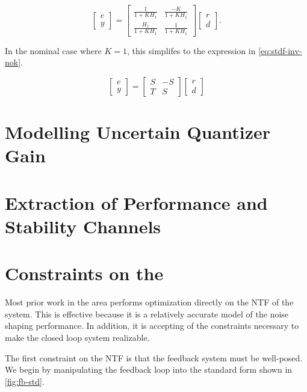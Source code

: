\begin{equation}
	\begin{bmatrix}
		e \\
		y
	\end{bmatrix} =
	\begin{bmatrix}
		\frac{1}{1 + KH_1} & \frac{-K}{1 + KH_1} \\
		\frac{H_1}{1 + KH_1} & \frac{1}{1 + KH_1}
	\end{bmatrix}
	\begin{bmatrix}
		r \\
		d
	\end{bmatrix}. \label{eq:stdf-inv}
\end{equation}

In the nominal case where $K = 1$, this simplifes to the expression in \autoref{eq:stdf-inv-nok}.

\begin{equation}
	\begin{bmatrix}
		e \\
		y
	\end{bmatrix} = 
	\begin{bmatrix}
		S & -S \\
		T & S
	\end{bmatrix}
	\begin{bmatrix}
		r \\
		d
	\end{bmatrix} \label{eq:stdf-inv-nok}
\end{equation}

\section{Modelling Uncertain Quantizer Gain}

\section{Extraction of Performance and Stability Channels}

\section{Constraints on the }

Most prior work in the area performs optimization directly on the \gls{NTF} of the system. This is effective because it is a relatively accurate model of the noise shaping performance. In addition, it is accepting of the constraints necessary to make the closed loop system realizable.

The first constraint on the \gls{NTF} is that the feedback system must be well-posed. We begin by manipulating the feedback loop into the standard form shown in \autoref{fig:fb-std}.